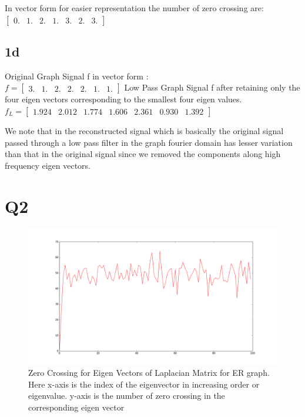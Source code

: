 \documentclass{article}
\begin{document}
In vector form for easier representation the number of zero crossing are: \\
$\begin{bmatrix}
  0. & 1. & 2. & 1. & 3. & 2. & 3.
\end{bmatrix}
$

\subsection*{1d}
Original Graph Signal f in vector form :\\
$ f =\begin{bmatrix}
  3. & 1. & 2. & 2. & 2. & 1. & 1.
\end{bmatrix}$
Low Pass Graph Signal f after retaining only the four eigen vectors corresponding to the smallest four eigen values.\\
$f_L =
\begin{bmatrix}
    1.924 & 2.012 & 1.774 & 1.606 & 2.361 & 0.930 & 1.392
\end{bmatrix}
$

We note that in the reconstructed signal which is basically the original signal passed through a low pass filter in the graph fourier domain has lesser variation than that in the original signal since we removed the components along high frequency eigen vectors.

\section*{Q2}
\begin{figure}[H]
  \centering
  \includegraphics[scale=0.25]{images/q2_num_zero_cross}
  \caption{Zero Crossing for Eigen Vectors of Laplacian Matrix for ER graph. Here x-axis is the index of the eigenvector in increasing order or eigenvalue. y-axis is the number of zero crossing in the corresponding eigen vector}
  \label{fig:q2}
\end{figure}
\end{document}
